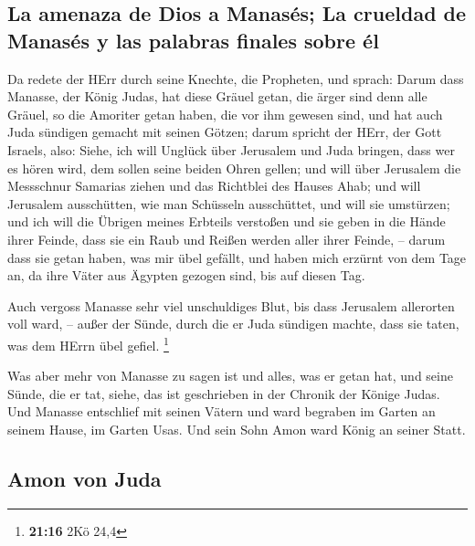 \hypertarget{la-amenaza-de-dios-a-manasuxe9s-la-crueldad-de-manasuxe9s-y-las-palabras-finales-sobre-uxe9l}{%
\subsection{La amenaza de Dios a Manasés; La crueldad de Manasés y las
palabras finales sobre
él}\label{la-amenaza-de-dios-a-manasuxe9s-la-crueldad-de-manasuxe9s-y-las-palabras-finales-sobre-uxe9l}}

 Da redete der HErr durch seine Knechte, die Propheten,
und sprach:  Darum dass Manasse, der König Judas, hat
diese Gräuel getan, die ärger sind denn alle Gräuel, so die Amoriter
getan haben, die vor ihm gewesen sind, und hat auch Juda sündigen
gemacht mit seinen Götzen;  darum spricht der HErr, der
Gott Israels, also: Siehe, ich will Unglück über Jerusalem und Juda
bringen, dass wer es hören wird, dem sollen seine beiden Ohren gellen;
 und will über Jerusalem die Messschnur Samarias ziehen
und das Richtblei des Hauses Ahab; und will Jerusalem ausschütten, wie
man Schüsseln ausschüttet, und will sie umstürzen;  und
ich will die Übrigen meines Erbteils verstoßen und sie geben in die
Hände ihrer Feinde, dass sie ein Raub und Reißen werden aller ihrer
Feinde, --  darum dass sie getan haben, was mir übel
gefällt, und haben mich erzürnt von dem Tage an, da ihre Väter aus
Ägypten gezogen sind, bis auf diesen Tag.

 Auch vergoss Manasse sehr viel unschuldiges Blut, bis
dass Jerusalem allerorten voll ward, -- außer der Sünde, durch die er
Juda sündigen machte, dass sie taten, was dem HErrn übel gefiel.
\footnote{\textbf{21:16} 2Kö 24,4}

 Was aber mehr von Manasse zu sagen ist und alles, was er
getan hat, und seine Sünde, die er tat, siehe, das ist geschrieben in
der Chronik der Könige Judas.  Und Manasse entschlief mit
seinen Vätern und ward begraben im Garten an seinem Hause, im Garten
Usas. Und sein Sohn Amon ward König an seiner Statt.

\hypertarget{amon-von-juda}{%
\subsection{Amon von Juda}\label{amon-von-juda}}

